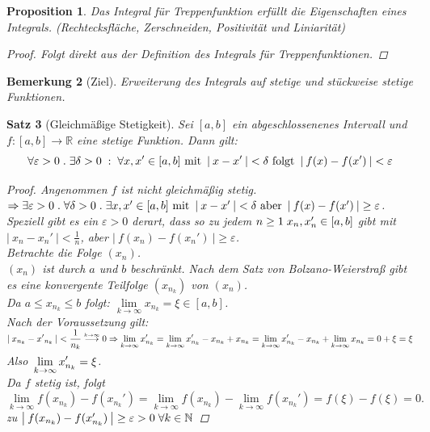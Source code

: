 \documentclass[a4paper,titlepage,oneside]{article}
\def\N{\ensuremath{\mathbb{N}} }
\def\R{\ensuremath{\mathbb{R}} }
\renewcommand{\epsilon}{\ensuremath{\varepsilon} }
\def\WSP{\text{Widerspruch! }}
\def\sp{\hspace{0,1cm}}
\def\spdot{\sp.\sp}
\def\spcolon{\sp:\sp}
\renewcommand{\liminf}[2][n]{\ensuremath{\lim\limits_{#1 \rightarrow \infty}{#2}}}
\newcommand{\abs}[1]{\ensuremath{\left|\:#1\:\right|}}
\newcommand{\longtoinf}[1][n]{\ensuremath{\overset{\scriptscriptstyle{#1 \to \infty}}{\longrightarrow}}}
\theoremstyle{thmstyle}
\newtheorem{satz}{Satz}[section]
\newtheorem{prop}[satz]{Proposition}
\newtheorem{bem}[satz]{Bemerkung}
\theoremstyle{subthmstyle}
\begin{document}
\begin{prop}
Das Integral für Treppenfunktion erfüllt die Eigenschaften eines Integrals. (Rechtecksfläche, Zerschneiden, Positivität und Liniarität)
\begin{proof} Folgt direkt aus der Definition des Integrals für Treppenfunktionen.
\end{proof}
\end{prop}

\begin{bem}[Ziel]
Erweiterung des Integrals auf stetige und stückweise stetige Funktionen.
\end{bem}

\begin{satz}[Gleichmäßige Stetigkeit]
Sei $[a,b]$ ein abgeschlossenenes Intervall und $ f: [a,b] \to \R $ eine stetige Funktion. Dann gilt:
\[\forall \epsilon > 0 \spdot \exists \delta > 0 \spcolon \forall x, x' \in [a,b] \text{ mit } \abs{x- x'} < \delta \text{ folgt } \abs{f(x) - f(x')} < \epsilon\]
\begin{proof}
Angenommen $f$ ist nicht gleichmäßig stetig. $\Rightarrow \exists \epsilon > 0 \spdot \forall \delta > 0 \spdot \exists x,x' \in [a,b] \text{ mit } \abs{x- x'} < \delta \text{ aber } \abs{f(x) - f(x')} \ge \epsilon$. Speziell gibt es ein $\epsilon > 0$ derart, dass so zu jedem $n \ge 1 \sp x_n, x_n' \in [a,b] $ gibt mit $\displaystyle \abs{x_n - x_n'} < \frac{1}{n}$, aber $\abs{f(x_n) - f(x_n')} \ge \epsilon$.\\
Betrachte die Folge $(x_n)$.\\
$(x_n)$ ist durch $a$ und $b$ beschränkt. Nach dem Satz von Bolzano-Weierstraß gibt es eine konvergente Teilfolge $(x_{n_k})$ von $(x_n)$.\\
Da $a \le x_{n_k} \le b$ folgt: $\liminf[k]{x_{n_k}} = \xi \in [a,b]$.\\
Nach der Voraussetzung gilt: $\displaystyle \abs{x_{n_k} - {x'}_{n_k}} < \frac{1}{n_k} \longtoinf[k] 0\\
\Rightarrow \liminf[k]{x_{n_k}'} = \liminf[k]{x_{n_k}' - x_{n_k} + x_{n_k}} =  \liminf[k]{x_{n_k}' - x_{n_k}} + \liminf[k]{x_{n_k}} = 0 + \xi = \xi$\\
Also  $\displaystyle \vphantom{\frac{1}{2}} \liminf[k]{x_{n_k}'} = \xi$.\\
Da $f$ stetig ist, folgt $\liminf[k]{f(x_{n_k}) - f(x_{n_k}')} = \liminf[k]{f(x_{n_k})} - \liminf[k]{f(x_{n_k}')} = f(\xi) - f(\xi) = 0. $\\
\WSP zu $\abs{f(x_{n_k}) - f(x_{n_k}')} \ge \epsilon > 0 \sp \forall k \in \N$
\end{proof}
\end{satz}
\end{document}
